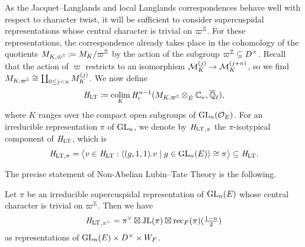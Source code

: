 \documentclass[../main.tex]{subfiles}
\begin{document}
As the Jacquet--Langlands and local Langlands correspondences behave well with respect to character twist, it will be sufficient to consider supercuspidal representations
whose central character is trivial on $\varpi^{\mathbb{Z}}$. 
For these representations,
the correspondence already takes place in the cohomology of the 
quotients $M_{K, \varpi^{\mathbb{Z}}} \coloneqq M_K/\varpi^{\mathbb{Z}}$ by the action of the
subgroup $\varpi^{\mathbb{Z}} \subseteq D^\times$. Recall that the action of 
$\varpi$ restricts to an isomorphism $\mathcal{M}_K^{(j)} \to \mathcal{M}_K^{(j+n)}$, so we find
$M_{K, \varpi^{\mathbb{Z}}} \cong \coprod_{0 \leq j < n} M_{K}^{(j)}$. We now define
\begin{equation} \label{eq:defHLT}
  \HLT \coloneq \colim_{K} \hHc^{n-1} (M_{K, \varpi^\Z} \otimes_{\br E}\Cp, \bar \Q_\ell),
\end{equation}
where $K$ ranges over the compact open subgroups of $\operatorname{GL}_n(\mathcal{O}_E)$. 
For an irreducible representation $\pi$ of $\operatorname{GL}_n$, we denote by ${\mathit H_{\mathrm{LT}}}_{,\pi}$ the 
$\pi$-isotypical component of $\mathit H_{\mathrm{LT}}$, which is
\begin{equation*}
  \mathit H_{\mathrm{LT}, \pi} = \big\langle v \in \mathit H_{\mathrm{LT}} : \langle (g,1,1).v \mid g \in \operatorname{GL}_n(E) \rangle 
  \cong \pi \big\rangle \subseteq \mathit H_{\mathrm{LT}}.
\end{equation*}

The precise statement of Non-Abelian Lubin--Tate Theory is the following.
\begin{thm}\label{thm:NonAbLTT}
  Let $\pi$ be an irreducible supercuspidal representation of $\operatorname{GL}_n(E)$ whose central character is trivial on $\varpi^{\mathbb{Z}}$.
  Then we have 
  \begin{equation*}
    {\mathit H_{\mathrm{LT}}}_{,\pi^\vee} = \pi^\vee \boxtimes \mathrm{JL}(\pi) \boxtimes \mathrm{rec}_F(\pi)(\tfrac{1-n}2)
  \end{equation*}
  as representations of $\operatorname{GL}_n(E) \times D^\times \times W_F$. 
\end{thm}
\end{document}
